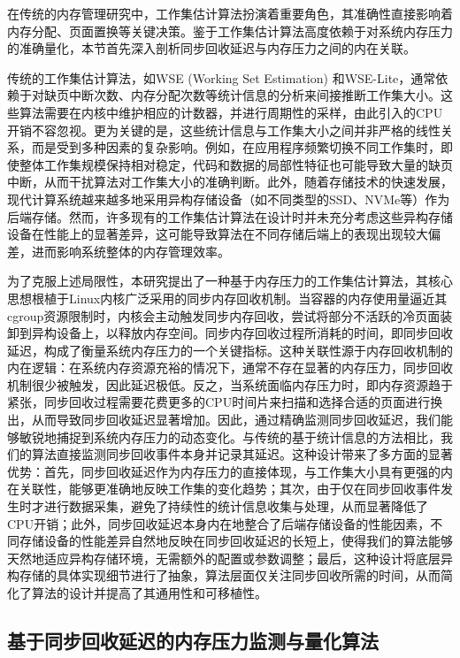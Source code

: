 在传统的内存管理研究中，工作集估计算法扮演着重要角色，其准确性直接影响着内存分配、页面置换等关键决策。鉴于工作集估计算法高度依赖于对系统内存压力的准确量化，本节首先深入剖析同步回收延迟与内存压力之间的内在关联。

传统的工作集估计算法，如WSE (Working Set Estimation) 和WSE-Lite，通常依赖于对缺页中断次数、内存分配次数等统计信息的分析来间接推断工作集大小。这些算法需要在内核中维护相应的计数器，并进行周期性的采样，由此引入的CPU开销不容忽视。更为关键的是，这些统计信息与工作集大小之间并非严格的线性关系，而是受到多种因素的复杂影响。例如，在应用程序频繁切换不同工作集时，即使整体工作集规模保持相对稳定，代码和数据的局部性特征也可能导致大量的缺页中断，从而干扰算法对工作集大小的准确判断。此外，随着存储技术的快速发展，现代计算系统越来越多地采用异构存储设备（如不同类型的SSD、NVMe等）作为后端存储。然而，许多现有的工作集估计算法在设计时并未充分考虑这些异构存储设备在性能上的显著差异，这可能导致算法在不同存储后端上的表现出现较大偏差，进而影响系统整体的内存管理效率。

为了克服上述局限性，本研究提出了一种基于内存压力的工作集估计算法，其核心思想根植于Linux内核广泛采用的同步内存回收机制。当容器的内存使用量逼近其cgroup资源限制时，内核会主动触发同步内存回收，尝试将部分不活跃的冷页面装卸到异构设备上，以释放内存空间。同步内存回收过程所消耗的时间，即同步回收延迟，构成了衡量系统内存压力的一个关键指标。这种关联性源于内存回收机制的内在逻辑：在系统内存资源充裕的情况下，通常不存在显著的内存压力，同步回收机制很少被触发，因此延迟极低。反之，当系统面临内存压力时，即内存资源趋于紧张，同步回收过程需要花费更多的CPU时间片来扫描和选择合适的页面进行换出，从而导致同步回收延迟显著增加。因此，通过精确监测同步回收延迟，我们能够敏锐地捕捉到系统内存压力的动态变化。与传统的基于统计信息的方法相比，我们的算法直接监测同步回收事件本身并记录其延迟。这种设计带来了多方面的显著优势：首先，同步回收延迟作为内存压力的直接体现，与工作集大小具有更强的内在关联性，能够更准确地反映工作集的变化趋势；其次，由于仅在同步回收事件发生时才进行数据采集，避免了持续性的统计信息收集与处理，从而显著降低了CPU开销；此外，同步回收延迟本身内在地整合了后端存储设备的性能因素，不同存储设备的性能差异自然地反映在同步回收延迟的长短上，使得我们的算法能够天然地适应异构存储环境，无需额外的配置或参数调整；最后，这种设计将底层异构存储的具体实现细节进行了抽象，算法层面仅关注同步回收所需的时间，从而简化了算法的设计并提高了其通用性和可移植性。

\subsection{基于同步回收延迟的内存压力监测与量化算法}


